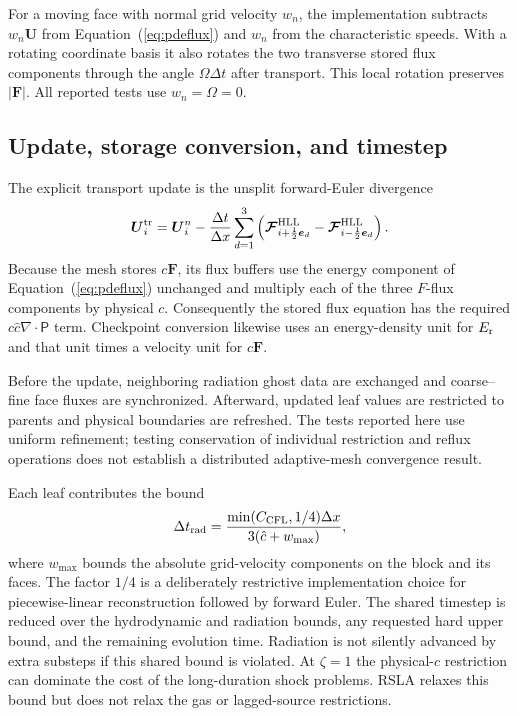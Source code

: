 \documentclass[manuscript]{aastex7}
\newcommand{\vct}[1]{\boldsymbol{#1}}
\newcommand{\Er}{E_{\rm r}}
\newcommand{\Fr}{\vct{F}}
\newcommand{\Prad}{\mathsf{P}}
\newcommand{\dt}{\Delta t}
\newcommand{\dx}{\Delta x}
\newcommand{\chat}{\hat{c}}
\begin{document}
For a moving face with normal grid velocity $w_n$, the implementation
subtracts $w_n\vct{U}$ from Equation~(\ref{eq:pdeflux}) and $w_n$ from
the characteristic speeds. With a rotating coordinate basis it also
rotates the two transverse stored flux components through the angle
$\Omega\dt$ after transport. This local rotation preserves $|\Fr|$.
All reported tests use $w_n=\Omega=0$.

\subsection{Update, storage conversion, and timestep}
The explicit transport update is the unsplit forward-Euler divergence
\begin{equation}
 \vct{U}^{\rm tr}_i=\vct{U}_i^n-
 \frac{\dt}{\dx}\sum_{d=1}^3
 \left(\vct{\mathcal{F}}_{i+\frac12\vct{e}_d}^{\rm HLL}
       -\vct{\mathcal{F}}_{i-\frac12\vct{e}_d}^{\rm HLL}\right).
 \label{eq:fv}
\end{equation}
Because the mesh stores $c\Fr$, its flux buffers use the energy component
of Equation~(\ref{eq:pdeflux}) unchanged and multiply each of the three
$F$-flux components by physical $c$. Consequently the stored flux equation
has the required $c\chat\nabla\cdot\Prad$ term. Checkpoint conversion likewise
uses an energy-density unit for $\Er$ and that unit times a velocity unit
for $c\Fr$.

Before the update, neighboring radiation ghost data are exchanged and
coarse--fine face fluxes are synchronized. Afterward, updated leaf values
are restricted to parents and physical boundaries are refreshed. The
tests reported here use uniform refinement; testing conservation of
individual restriction and reflux operations does not establish a
distributed adaptive-mesh convergence result.

Each leaf contributes the bound
\begin{equation}
 \dt_{\rm rad}=\frac{\min(C_{\rm CFL},1/4)\dx}
 {3(\chat+w_{\max})},
 \label{eq:cfl}
\end{equation}
where $w_{\max}$ bounds the absolute grid-velocity components on the
block and its faces. The factor $1/4$ is a deliberately restrictive
implementation choice for piecewise-linear reconstruction followed by
forward Euler. The shared timestep is reduced over the hydrodynamic and
radiation bounds, any requested hard upper bound, and the remaining
evolution time. Radiation is not silently advanced by extra substeps if
this shared bound is violated. At $\zeta=1$ the physical-$c$ restriction
can dominate the cost of the long-duration shock problems. RSLA relaxes
this bound but does not relax the gas or lagged-source restrictions.
\end{document}
